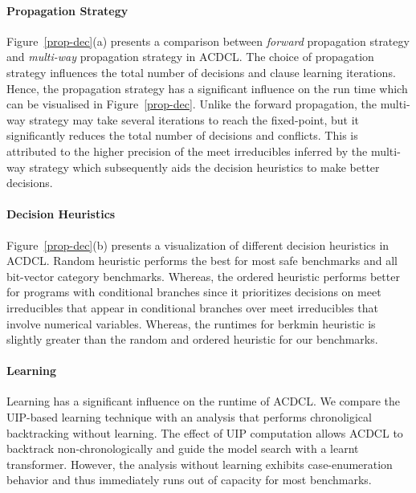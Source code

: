 \paragraph {\textbf{Propagation Strategy}}      
Figure~\ref{prop-dec}(a) presents a comparison between {\em forward} propagation 
strategy and {\em multi-way} propagation strategy in ACDCL.  The choice of 
propagation strategy influences the total number of decisions and clause 
learning iterations.  Hence, the propagation strategy has a significant 
influence on the run time which can be visualised in Figure~\ref{prop-dec}.  
Unlike the forward propagation, the multi-way strategy may take several 
iterations to reach the fixed-point, but it significantly reduces the 
total number of decisions and conflicts.  This is attributed to the higher 
precision of the meet irreducibles inferred by the multi-way strategy which 
subsequently aids the decision heuristics to make better decisions. 

\paragraph {\textbf{Decision Heuristics}} Figure~\ref{prop-dec}(b) presents a 
visualization of different decision heuristics in ACDCL.  Random heuristic
performs the best for most safe benchmarks and all bit-vector category 
benchmarks.  Whereas, the ordered heuristic performs better for programs 
with conditional branches since it prioritizes decisions on meet 
irreducibles that appear in conditional branches over meet irreducibles 
that involve numerical variables.  Whereas, the runtimes for berkmin 
heuristic is slightly greater than the random and ordered heuristic 
for our benchmarks. 

\paragraph {\textbf{Learning}} Learning has a significant influence on
the runtime of ACDCL.  We compare the UIP-based learning technique with 
an analysis that performs chronoligical backtracking without learning. 
The effect of UIP computation allows ACDCL to backtrack non-chronologically 
and guide the model search with a learnt transformer.  However, the analysis 
without learning exhibits case-enumeration behavior and thus immediately 
runs out of capacity for most benchmarks. 


